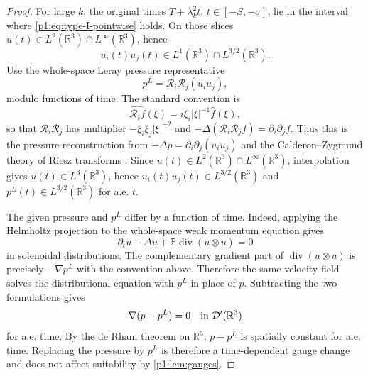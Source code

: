 \documentclass[11pt]{amsart}
\theoremstyle{plain}
\theoremstyle{definition}
\theoremstyle{remark}
\numberwithin{equation}{section}
\newcommand{\R}{\mathbb R}
\newcommand{\divergence}{\operatorname{div}}
\begin{document}
\begin{proof}
For large \(k\), the original times \(T+\lambda_k^2t\), \(t\in[-S,-\sigma]\),
lie in the interval where \eqref{p1:eq:type-I-pointwise} holds.  On those slices
\(u(t)\in L^2(\R^3)\cap L^\infty(\R^3)\), hence
\[
   u_i(t)u_j(t)\in L^1(\R^3)\cap L^{3/2}(\R^3).
\]
Use the whole-space Leray pressure representative
\[
   p^L=\mathcal R_i\mathcal R_j(u_i u_j),
\]
modulo functions of time.  The standard convention is
\[
   \widehat{\mathcal R_i f}(\xi)=i\xi_i|\xi|^{-1}\widehat f(\xi),
\]
so that \(\mathcal R_i\mathcal R_j\) has multiplier
\(-\xi_i\xi_j|\xi|^{-2}\) and
\(-\Delta(\mathcal R_i\mathcal R_j f)=\partial_i\partial_jf\).  Thus this is
the pressure reconstruction from
\(-\Delta p=\partial_i\partial_j(u_i u_j)\) and the Calderon--Zygmund theory
of Riesz transforms \cite{Stein1970,Sohr2001}.  Since
\(u(t)\in L^2(\R^3)\cap L^\infty(\R^3)\), interpolation gives
\(u(t)\in L^3(\R^3)\), hence \(u_i(t)u_j(t)\in L^{3/2}(\R^3)\) and
\(p^L(t)\in L^{3/2}(\R^3)\) for a.e. \(t\).

The given pressure and \(p^L\) differ by a function of time.  Indeed, applying
the Helmholtz projection to the whole-space weak momentum equation gives
\[
   \partial_tu-\Delta u+\mathbb P\divergence(u\otimes u)=0
\]
in solenoidal distributions.  The complementary gradient part of
\(\divergence(u\otimes u)\) is precisely
\(-\nabla p^L\) with the convention above.  Therefore the same velocity field
solves the distributional equation with \(p^L\) in place of \(p\).  Subtracting
the two formulations gives
\[
   \nabla(p-p^L)=0
   \quad\hbox{in }\mathcal D'(\R^3)
\]
for a.e. time.  By the de Rham theorem on \(\R^3\), \(p-p^L\) is spatially
constant for a.e. time.  Replacing the pressure by \(p^L\) is therefore a
time-dependent gauge change and does not affect suitability by
\cref{p1:lem:gauges}.


\end{proof}
\end{document}
